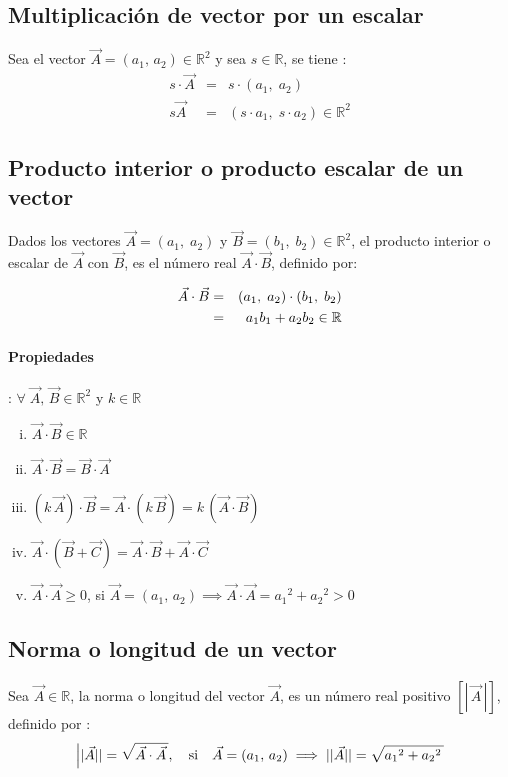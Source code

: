 \documentclass[11pt, twocolumn, landscape, a4paper]{article}
\begin{document}
\subsection*{Multiplicación de vector por un escalar}
\noindent Sea el vector $\vec{A} = (a_1,\,a_2) \in \mathbb{R}^2$ 
y sea $s \in \mathbb{R}$, se tiene : \newline 
\begin{eqnarray*}
s \cdot \vec{A} &=& s \cdot (a_1,\;a_2) \\
s\vec{A} &=&  (s \cdot a_1,\; s \cdot a_2) \in \mathbb{R}^2
\end{eqnarray*}

\subsection*{Producto interior o producto escalar de un vector}
Dados los vectores $\vec{A} = (a_1,\;a_2)$ y $\vec{B} = (b_1,\;b_2) \in \mathbb{R}^2$, el producto interior o escalar de $\vec{A}$ con $\vec{B}$, es el número real $\vec{A}\cdot\vec{B}$, definido por:  

\begin{eqnarray*}
\vec{A} \cdot \vec{B} &=& (a_{1},\;a_{2}) \cdot (b_{1},\;b_{2}) \\ 
\empty &=& a_{1}b_{1} + a_{2}b_{2}\in \mathbb{R}
\end{eqnarray*}

\paragraph*{Propiedades} : \quad$\forall\;\vec{A},\,\vec{B} \in \mathbb{R}^{2}$ y $k \in \mathbb{R}$
\begin{enumerate}[i.]
\item{$\vec{A} \cdot \vec{B} \in \mathbb{R}$}
\item{$\vec{A} \cdot \vec{B} = \vec{B} \cdot \vec{A}$}
\item{$(k\,\vec{A}) \cdot \vec{B} = \vec{A} \cdot (k\,\vec{B}) = k\,(\vec{A} \cdot \vec{B})$}
\item{$\vec{A} \cdot (\vec{B} + \vec{C}) = \vec{A} \cdot \vec{B} + \vec{A} \cdot \vec{C}$}
\item{$\vec{A} \cdot \vec{A} \ge 0$, si $\vec{A} = (a_{1},\,a_{2}) \implies \vec{A}\cdot \vec{A} = {a_{1}}^{2} + {a_{2}}^{2} > 0$}
\end{enumerate}

\subsection*{Norma o longitud de un vector}
Sea $\vec{A} \in \mathbb{R}$, la norma o longitud del vector $\vec{A}$, es un número real positivo $[|\,\vec{A}\,|]$, definido por :  
\[
\Big{||} \vec{A} || = \sqrt{\vec{A} \cdot \vec{A}\,}, \quad\text{si}\quad\vec{A} = (a_{1},\,a_{2}) \implies || \vec{A} || = \sqrt{{a_{1}}^{2} + {a_{2}}^{2}\,}
\]
\end{document}
